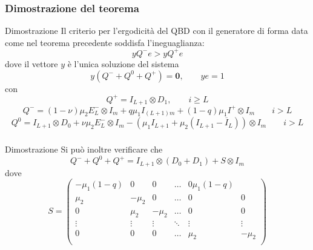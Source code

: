 \documentclass{beamer}
\begin{document}
\begin{frame}
    \frametitle{Dimostrazione del teorema}
    \begin{block}{Dimostrazione}
        \small{Il criterio per l'ergodicità del QBD con il generatore di forma data come nel teorema precedente soddisfa l'ineguaglianza:
        \begin{equation*}
            y Q^- e > y Q^+e
        \end{equation*}}
        dove il vettore $y$ è l'unica soluzione del sistema
        \small{\begin{equation*}
            y(Q^- + Q^0 + Q^+) = \textbf{0}, \qquad ye = 1
        \end{equation*}}
        con
        \small{\begin{equation*}
            Q^+ = I_{L+1} \otimes D_1, \qquad i \geq L
        \end{equation*}
        \begin{equation*}
            Q^- = (1-\nu) \mu_2 E_L^- \otimes I_m + q \mu_1 I_{(L+1)m} + (1-q)\mu_1I^+ \otimes I_m \qquad i > L
        \end{equation*}
        \begin{equation*}
            Q^0 = I_{L+1} \otimes D_0 + \nu \mu_2 E_L^{-} \otimes I_m - (\mu_1 I_{L+1} + \mu_2(I_{L+1} - \overline{I}_L)) \otimes I_m \qquad i > L
        \end{equation*}}

    \end{block}
\end{frame}


\begin{frame}
    \frametitle{}
    \begin{block}{Dimostrazione}
        Si può inoltre verificare che
        \begin{equation*}\label{eq:bigotimes}
            Q^- + Q^0 + Q^+ = I_{L+1} \otimes (D_0 + D_1) + S \otimes I_{m}
        \end{equation*}
        dove
        \begin{equation*}
            S =
            \begin{pmatrix}
                -\mu_1 (1-q) & 0 & 0 & \dots & 0 \mu_1(1-q) \\
                \mu_2 & -\mu_2 & 0 & \dots & 0 & 0 \\
                0 & \mu_2 & -\mu_2 & \dots & 0 & 0 \\
                \vdots & \vdots & \vdots & \ddots & \vdots & \vdots \\
                0 & 0 & 0 & \dots & \mu_2 & -\mu_2 \\
            \end{pmatrix}
        \end{equation*}
    \end{block}
\end{frame}
\end{document}
